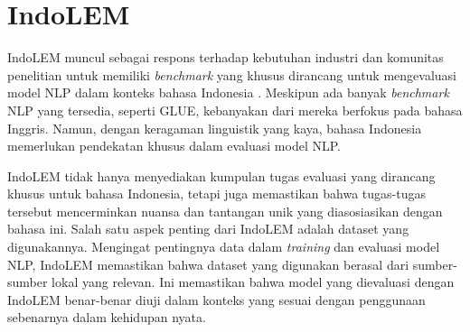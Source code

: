\section{IndoLEM}
IndoLEM muncul sebagai respons terhadap kebutuhan industri dan komunitas penelitian untuk memiliki \textit{benchmark} yang khusus dirancang untuk mengevaluasi model NLP dalam konteks bahasa Indonesia \parencite{indolem}. Meskipun ada banyak \textit{benchmark} NLP yang tersedia, seperti GLUE, kebanyakan dari mereka berfokus pada bahasa Inggris. Namun, dengan keragaman linguistik yang kaya, bahasa Indonesia memerlukan pendekatan khusus dalam evaluasi model NLP.

IndoLEM tidak hanya menyediakan kumpulan tugas evaluasi yang dirancang khusus untuk bahasa Indonesia, tetapi juga memastikan bahwa tugas-tugas tersebut mencerminkan nuansa dan tantangan unik yang diasosiasikan dengan bahasa ini. Salah satu aspek penting dari IndoLEM adalah dataset yang digunakannya. Mengingat pentingnya data dalam \textit{training} dan evaluasi model NLP, IndoLEM memastikan bahwa dataset yang digunakan berasal dari sumber-sumber lokal yang relevan. Ini memastikan bahwa model yang dievaluasi dengan IndoLEM benar-benar diuji dalam konteks yang sesuai dengan penggunaan sebenarnya dalam kehidupan nyata.

